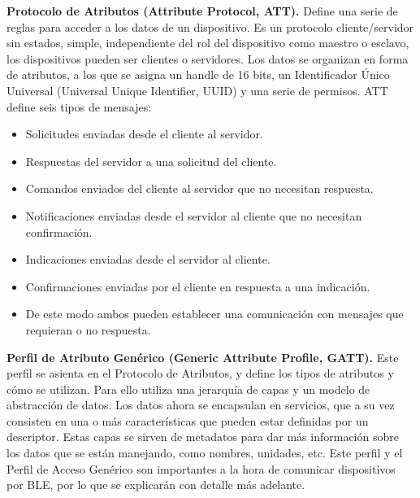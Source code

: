 \textbf{Protocolo de Atributos (Attribute Protocol, ATT).} Define una serie de reglas para acceder a los datos de un dispositivo. Es un protocolo cliente/servidor sin estados, simple, independiente del rol del dispositivo como maestro o esclavo, los dispositivos pueden ser clientes o servidores. Los datos se organizan en forma de atributos, a los que se asigna un handle de 16 bits, un Identificador Único Universal (Universal Unique Identifier, UUID) y una serie de permisos.
ATT define seis tipos de mensajes:
\begin{itemize}
	\item Solicitudes enviadas desde el cliente al servidor.
	\item Respuestas del servidor a una solicitud del cliente.
	\item Comandos enviados del cliente al servidor que no necesitan respuesta. 
	\item Notificaciones enviadas desde el servidor al cliente que no necesitan confirmación.
	\item Indicaciones enviadas desde el servidor al cliente.
	\item Confirmaciones enviadas por el cliente en respuesta a una indicación.
	\item De este modo ambos pueden establecer una comunicación con mensajes que requieran o no respuesta.
\end{itemize}


\textbf{Perfil de Atributo Genérico (Generic Attribute Profile, GATT).} Este perfil se asienta en el Protocolo de Atributos, y define los tipos de atributos y cómo se utilizan. 
Para ello utiliza una jerarquía de capas y un modelo de abstracción de datos. Los datos ahora se encapsulan en servicios, que a su vez consisten en una o más características que pueden estar definidas por un descriptor. Estas capas se sirven de metadatos para dar más información sobre los datos que se están manejando, como nombres, unidades, etc.
Este perfil y el Perfil de Acceso Genérico son importantes a la hora de comunicar dispositivos por BLE, por lo que se explicarán con detalle más adelante.


